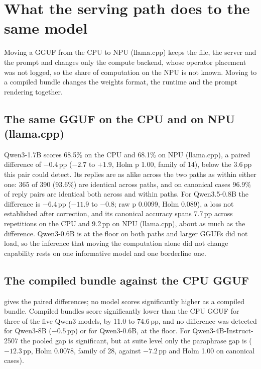 \documentclass[11pt]{article}
\begin{document}
\section{What the serving path does to the same model}\label{sec:path}

Moving a GGUF from the CPU to NPU (llama.cpp) keeps the file, the server and the prompt and changes only the compute backend, whose operator placement was not logged, so the share of computation on the NPU is not known. Moving to a compiled bundle changes the weights format, the runtime and the prompt rendering together.

\subsection{The same GGUF on the CPU and on NPU (llama.cpp)}\label{sec:samegguf}

Qwen3-1.7B scores 68.5\% on the CPU and 68.1\% on NPU (llama.cpp), a paired difference of $-0.4$\,pp ($-2.7$ to $+1.9$, Holm p 1.00, family of 14), below the 3.6\,pp this pair could detect. Its replies are as alike across the two paths as within either one: 365 of 390 (93.6\%) are identical across paths, and on canonical cases 96.9\% of reply pairs are identical both across and within paths. For Qwen3.5-0.8B the difference is $-6.4$\,pp ($-11.9$ to $-0.8$; raw p 0.0099, Holm 0.089), a loss not established after correction, and its canonical accuracy spans 7.7\,pp across repetitions on the CPU and 9.2\,pp on NPU (llama.cpp), about as much as the difference. Qwen3-0.6B is at the floor on both paths and larger GGUFs did not load, so the inference that moving the computation alone did not change capability rests on one informative model and one borderline one.

\subsection{The compiled bundle against the CPU GGUF}\label{sec:compiled}

 gives the paired differences; no model scores significantly higher as a compiled bundle. Compiled bundles score significantly lower than the CPU GGUF for three of the five Qwen3 models, by 11.0 to 74.6\,pp, and no difference was detected for Qwen3-8B ($-0.5$\,pp) or for Qwen3-0.6B, at the floor. For Qwen3-4B-Instruct-2507 the pooled gap is significant, but at suite level only the paraphrase gap is ($-12.3$\,pp, Holm 0.0078, family of 28, against $-7.2$\,pp and Holm 1.00 on canonical cases).
\end{document}
